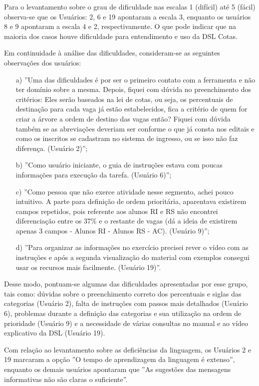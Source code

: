 \newpage
Para o levantamento sobre o grau de dificuldade nas escalas 1 (difícil) até 5 (fácil) observa-se que os Usuários: 2, 6 e 19 apontaram a escala 3, enquanto os usuários 8 e 9 apontaram a escala 4 e 2, respectivamente. O que pode indicar que na maioria dos casos houve dificuldade para entendimento e uso da DSL Cotas.

Em continuidade à análise das dificuldades, consideram-se as seguintes observações dos usuários:

\begin{enumerate}
    \item [a)] ''Uma das dificuldades é por ser o primeiro contato com a ferramenta e não ter domínio sobre a mesma. Depois, fiquei com dúvida no preenchimento dos critérios: Eles serão baseados na lei de cotas, ou seja, os percentuais de destinação para cada vaga já estão estabelecidos, fica a critério de quem for criar a árvore a ordem de destino das vagas então? Fiquei com dúvida também se as abreviações deveriam ser conforme o que já consta nos editais e como os inscritos se cadastram no sistema de ingresso, ou se isso não faz diferença. (Usuário 2)''; 
    \item [b)] ''Como usuário iniciante, o guia de instruções estava com poucas informações para execução da tarefa. (Usuário 6)'';     
    \item [c)] ''Como pessoa que não exerce atividade nesse segmento, achei pouco intuitivo. A parte para definição de ordem prioritária, aparentava existirem campos repetidos, pois referente aos alunos RI e RS não encontrei diferenciação entre os 37\% e o restante de vagas (dá a ideia de existirem apenas 3 campos - Alunos RI - Alunos RS - AC). (Usuário 9)'';
    \item [d)] ''Para organizar as informações no exercício precisei rever o vídeo com as instruções e após a segunda visualização do material com exemplos consegui usar os recursos mais facilmente. (Usuário 19)''.     
\end{enumerate}

Desse modo, pontuam-se algumas das dificuldades apresentadas por esse grupo, tais como: dúvidas sobre o preenchimento correto dos percentuais e siglas das categorias (Usuário 2), falta de instruções com passos mais detalhados (Usuário 6), problemas durante a definição das categorias e sua utilização na ordem de prioridade (Usuário 9) e a necessidade de várias consultas no manual e ao vídeo explicativo da DSL (Usuário 19). 

Com relação ao levantamento sobre as deficiências da linguagem, os Usuários 2 e 19 marcaram a opção ''O tempo de aprendizagem da linguagem é extenso'', enquanto os demais usuários apontaram que ''As sugestões das mensagens informativas não são claras o suficiente''. 

